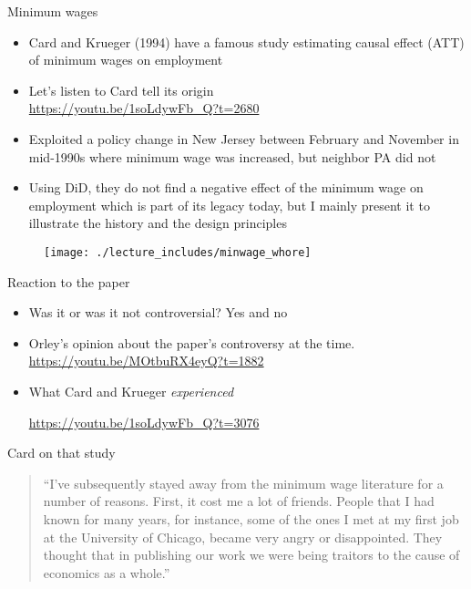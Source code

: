 \documentclass{beamer}
\begin{document}
\begin{frame}{Minimum wages}

\begin{itemize}
\item Card and Krueger (1994) have a famous study estimating causal effect (ATT) of minimum wages on employment
\item Let's listen to Card tell its origin \\ \url{https://youtu.be/1soLdywFb_Q?t=2680}
\item Exploited a policy change in New Jersey between February and November in mid-1990s where minimum wage was increased, but neighbor PA did not
\item Using DiD, they do not find a negative effect of the minimum wage on employment which is part of its legacy today, but I mainly present it to illustrate the history and the design principles
\end{itemize}

\end{frame}

\begin{frame}
	\begin{figure}
	\texttt{[image: ./lecture\_includes/minwage\_whore]}
	\end{figure}
\end{frame}


\begin{frame}{Reaction to the paper}

\begin{itemize}

\item Was it or was it not controversial?  Yes and no

\item Orley's opinion about the paper's controversy at the time.  \\ \url{https://youtu.be/MOtbuRX4eyQ?t=1882}

\item What Card and Krueger \emph{experienced} 

\url{https://youtu.be/1soLdywFb_Q?t=3076}



\end{itemize}

\end{frame}

\begin{frame}{Card on that study}

\begin{quote}
``I’ve subsequently stayed away from the minimum wage literature for a number of reasons. First, it cost me a lot of friends. People that I had known for many years, for instance, some of the ones I met at my first job at the University of Chicago, became very angry or disappointed. They thought that in publishing our work we were being traitors to the cause of economics as a whole.''
\end{quote}


\end{frame}
\end{document}
